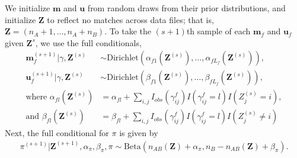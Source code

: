 \documentclass[ba]{imsart}
\begin{document}
We initialize $\bm{m}$ and $\bm{u}$ from random draws from their prior distributions, and initialize $\bm{Z}$ to reflect no matches across data files; that is, $\bm{Z} = (n_A + 1, \ldots, n_A + n_B)$. To take the $(s+1)$th sample of each $\bm{m}_f$ and $\bm{u}_f$ given $\bm{Z}^s$, we use the full conditionals,
\begin{subequations}
\begin{align}
	\bm{m}_f^{(s+1)}|\gamma, \bm{Z}^{(s)} &\sim \text{Dirichlet}(\alpha_{f1}(\bm{Z}^{(s)}), \ldots, \alpha_{fL_f}(\bm{Z}^{(s)})), \label{eqn:m_update} \\
	\bm{u}_f^{(s+1)}|\gamma, \bm{Z}^{(s)} &\sim \text{Dirichlet}(\beta_{f1}(\bm{Z}^{(s)}), \ldots, \beta_{fL_f}(\bm{Z}^{(s)})), \label{eqn:u_update} \\
	\text{where }\alpha_{fl}(\bm{Z}^{(s)})&= \alpha_{fl} + \sum_{i,j} I_{obs}(\gamma_{ij}^f) I(\gamma_{ij}^f = l) I(Z_j^{(s)} = i), \label{eqn:alpha_update} \\
	\text{and } \beta_{fl}(\bm{Z}^{(s)})&=  \beta_{fl} + \sum_{i,j} I_{obs}(\gamma_{ij}^f) I(\gamma_{ij}^f = l) I(Z_j^{(s)} \neq i) \label{eqn:beta_update}
\end{align}
\end{subequations}
Next, the full conditional for $\pi$ is given by
\begin{align}
	\pi^{(s+1)}|\bm{Z}^{(s+1)},  \alpha_{\pi}, \beta_{\pi}, \pi \sim  \text{Beta}(n_{AB}(\bm{Z}) + \alpha_{\pi}, n_B - n_{AB}(\bm{Z}) + \beta_{\pi}).
\end{align}
\end{document}
